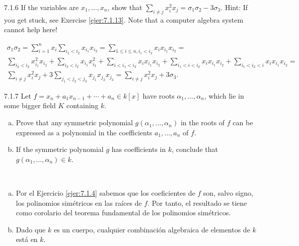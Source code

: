 \documentclass[twoside]{article}
\begin{document}
\begin{ejercicio}{7.1.6}
If the variables are $x_1, \dots , x_n$, show that $\sum_{i\neq j} x^2_i
x_j = σ_1σ_2 −3σ_3$. Hint: If you get stuck,
see Exercise \ref{ejer:7.1.13}. Note that a computer algebra system cannot help here!
\end{ejercicio}
\begin{solucion}
\begin{gather*}
\sigma_1\sigma_2=\sum_{i=1}^nx_i\sum_{i_1<i_2}x_{i_1}x_{i_2}=\sum_{1\leq i\leq n, i_1<i_2}x_ix_{i_1}x_{i_2}=\\
\sum_{i_2<i_2}x_{i_1}^2x_{i_2}+\sum_{i_2<i_2}x_{i_1}x_{i_2}^2+\sum_{i<i_1<i_2}x_ix_{i_1}x_{i_2}+\sum_{i_1<i<i_2}x_ix_{i_1}x_{i_2}+\sum_{i_1<i_2<i}x_ix_{i_1}x_{i_2}=\\
\sum_{i\neq j} x_i^2x_j+3\sum_{j_1<j_2<j_3}x_{j_1}x_{j_2}x_{j_3}=\sum_{i\neq j} x_i^2x_j+3\sigma_3.
\end{gather*}
\end{solucion}
\newpage

\begin{ejercicio}{7.1.7}
Let $f = x_n + a_1x_{n−1} + \cdots + a_n ∈ k[x]$ have roots $α_1,\dots, α_n$, which lie in some bigger
field $K$ containing $k$.
\begin{enumerate}[a.]
\item Prove that any symmetric polynomial $g(α_1, \dots , α_n)$ in the roots of $f$ can be expressed
as a polynomial in the coefficients $a_1, \dots , a_n$ of $f$.
\item If the symmetric polynomial $g$ has coefficients in $k$, conclude that
$g(α_1, \dots , α_n) ∈ k$.
\end{enumerate}
 
\end{ejercicio}
\begin{solucion}\
\begin{enumerate}[a.]
\item Por el Ejercicio \ref{ejer:7.1.4} sabemos que los coeficientes de $f$ son, salvo signo, los polinomios simétricos en las raíces de $f$. Por tanto, el resultado se tiene como corolario del teorema fundamental de los polinomios simétricos.
\item Dado que $k$ es un cuerpo, cualquier combinación algebraica de elementos de $k$ está en $k$.
\end{enumerate}

\end{solucion}

\newpage
\end{document}
